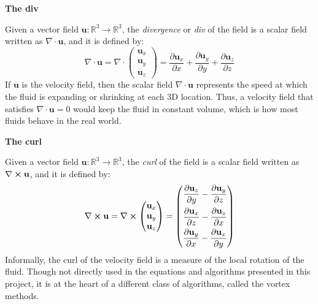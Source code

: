\gapM

\textbf{The div}

\gapS

Given a vector field $\textbf{u} : \mathbb{R} ^3 \rightarrow \mathbb{R} ^3$, the \textit{divergence} or \textit{div} of the field is a scalar field written as $\nabla \cdot \textbf{u}$, and it is defined by:
$$
    \nabla \cdot \textbf{u} 
    = \nabla \cdot 
    \begin{pmatrix}
        \textbf{u}_x \\
        \textbf{u}_y \\
        \textbf{u}_z
    \end{pmatrix}
    =
    \frac{\partial \textbf{u}_x}{\partial x} +  
    \frac{\partial \textbf{u}_y}{\partial y} +
    \frac{\partial \textbf{u}_z}{\partial z}
$$
If $\textbf{u}$ is the velocity field, then the scalar field $\nabla \cdot \textbf{u}$ represents the speed at which the fluid is expanding or shrinking at each 3D location. Thus, a velocity field that satisfies $\nabla \cdot \textbf{u} = 0$ would keep the fluid in constant volume, which is how most fluids behave in the real world.


\gapM

\textbf{The curl}

\gapS

Given a vector field $\textbf{u} : \mathbb{R} ^3 \rightarrow \mathbb{R} ^3$, the \textit{curl} of the field is a scalar field written as $\nabla \cross \textbf{u}$, and it is defined by:
$$
    \nabla \cross \textbf{u} = 
    \nabla \cross \begin{pmatrix}
        \textbf{u}_x \\
        \textbf{u}_y \\
        \textbf{u}_z
    \end{pmatrix}
    =
    \left(
    \begin{aligned}
        \frac{\partial \textbf{u}_z}{\partial y} - 
            \frac{\partial \textbf{u}_y}{\partial z} \\
        \frac{\partial \textbf{u}_x}{\partial z} - 
            \frac{\partial \textbf{u}_z}{\partial x} \\
        \frac{\partial \textbf{u}_y}{\partial x} - 
            \frac{\partial \textbf{u}_x}{\partial y} \\
    \end{aligned} \right)
$$
Informally, the curl of the velocity field is a measure of the local rotation of the fluid. Though not directly used in the equations and algorithms presented in this project, it is at the heart of a different class of algorithms, called the vortex methods\cite{angelidis2005simulation}.


